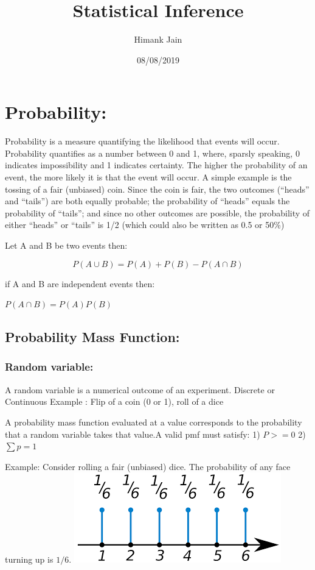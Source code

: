 \documentclass[]{article}
\title{Statistical Inference}
\author{Himank Jain}
\date{08/08/2019}
\begin{document}
\maketitle

\hypertarget{probability}{%
\section{Probability:}\label{probability}}

Probability is a measure quantifying the likelihood that events will
occur. Probability quantifies as a number between 0 and 1, where,
sparsly speaking, 0 indicates impossibility and 1 indicates certainty.
The higher the probability of an event, the more likely it is that the
event will occur. A simple example is the tossing of a fair (unbiased)
coin. Since the coin is fair, the two outcomes (``heads'' and ``tails'')
are both equally probable; the probability of ``heads'' equals the
probability of ``tails''; and since no other outcomes are possible, the
probability of either ``heads'' or ``tails'' is 1/2 (which could also be
written as 0.5 or 50\%)

Let A and B be two events then:

\[P(A \cup B)=P(A)+P(B)-P(A \cap B) \]

if A and B are independent events then:

\(P(A\cap B)=P(A)P(B)\)

\hypertarget{probability-mass-function}{%
\subsection{Probability Mass
Function:}\label{probability-mass-function}}

\hypertarget{random-variable}{%
\subsubsection{Random variable:}\label{random-variable}}

A random variable is a numerical outcome of an experiment. Discrete or
Continuous Example : Flip of a coin (0 or 1), roll of a dice

A probability mass function evaluated at a value corresponds to the
probability that a random variable takes that value.A valid pmf must
satisfy: 1) \(P >=0\) 2) \(\sum p=1\)

Example: Consider rolling a fair (unbiased) dice. The probability of any
face turning up is \(1/6\). \includegraphics{pmf.png}
\end{document}
